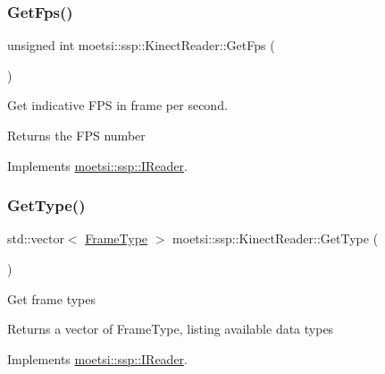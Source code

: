 \subsubsection{\texorpdfstring{Get\+Fps()}{GetFps()}}
{\footnotesize\ttfamily unsigned int moetsi\+::ssp\+::\+Kinect\+Reader\+::\+Get\+Fps (\begin{DoxyParamCaption}{ }\end{DoxyParamCaption})\hspace{0.3cm}{\ttfamily [virtual]}}

Get indicative F\+PS in frame per second. \begin{DoxyReturn}{Returns}
the F\+PS number 
\end{DoxyReturn}


Implements \hyperlink{classmoetsi_1_1ssp_1_1IReader_a9f6a8650ca290b011b8e5451eeae9f32}{moetsi\+::ssp\+::\+I\+Reader}.

\mbox{\label{classmoetsi_1_1ssp_1_1KinectReader_aef896aa686cbe1ea82dfc6aad46b6ff7}} 
\subsubsection{\texorpdfstring{Get\+Type()}{GetType()}}
{\footnotesize\ttfamily std\+::vector$<$ \hyperlink{namespacemoetsi_1_1ssp_a46efdfa2cd5a28ead465dcc8006b5a87}{Frame\+Type} $>$ moetsi\+::ssp\+::\+Kinect\+Reader\+::\+Get\+Type (\begin{DoxyParamCaption}{ }\end{DoxyParamCaption})\hspace{0.3cm}{\ttfamily [virtual]}}

Get frame types \begin{DoxyReturn}{Returns}
a vector of Frame\+Type, listing available data types 
\end{DoxyReturn}


Implements \hyperlink{classmoetsi_1_1ssp_1_1IReader_a4116c1931fde7bd66133934ffdca1cce}{moetsi\+::ssp\+::\+I\+Reader}.

\mbox{\label{classmoetsi_1_1ssp_1_1KinectReader_a315690c46e153a35d4ded1189e93af08}} 
